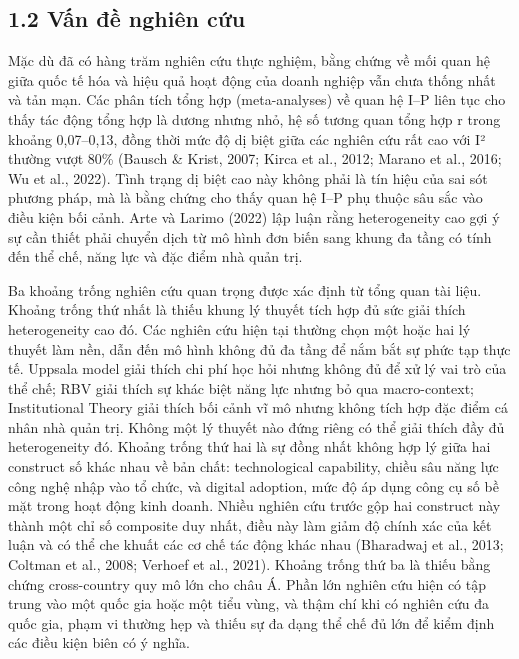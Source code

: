 \documentclass[12pt,a4paper]{article}
\begin{document}
\hypertarget{12-vux1ea5n-ux111ux1ec1-nghiuxean-cux1ee9u}{%
\subsection{1.2 Vấn đề nghiên
cứu}\label{12-vux1ea5n-ux111ux1ec1-nghiuxean-cux1ee9u}}

Mặc dù đã có hàng trăm nghiên cứu thực nghiệm, bằng chứng về mối quan hệ
giữa quốc tế hóa và hiệu quả hoạt động của doanh nghiệp vẫn chưa thống
nhất và tản mạn. Các phân tích tổng hợp (meta-analyses) về quan hệ I--P
liên tục cho thấy tác động tổng hợp là dương nhưng nhỏ, hệ số tương quan
tổng hợp r trong khoảng 0,07--0,13, đồng thời mức độ dị biệt giữa các
nghiên cứu rất cao với I² thường vượt 80\% (Bausch \& Krist, 2007; Kirca
et al., 2012; Marano et al., 2016; Wu et al., 2022). Tình trạng dị biệt
cao này không phải là tín hiệu của sai sót phương pháp, mà là bằng chứng
cho thấy quan hệ I--P phụ thuộc sâu sắc vào điều kiện bối cảnh. Arte và
Larimo (2022) lập luận rằng heterogeneity cao gợi ý sự cần thiết phải
chuyển dịch từ mô hình đơn biến sang khung đa tầng có tính đến thể chế,
năng lực và đặc điểm nhà quản trị.

Ba khoảng trống nghiên cứu quan trọng được xác định từ tổng quan tài
liệu. Khoảng trống thứ nhất là thiếu khung lý thuyết tích hợp đủ sức
giải thích heterogeneity cao đó. Các nghiên cứu hiện tại thường chọn một
hoặc hai lý thuyết làm nền, dẫn đến mô hình không đủ đa tầng để nắm bắt
sự phức tạp thực tế. Uppsala model giải thích chi phí học hỏi nhưng
không đủ để xử lý vai trò của thể chế; RBV giải thích sự khác biệt năng
lực nhưng bỏ qua macro-context; Institutional Theory giải thích bối cảnh
vĩ mô nhưng không tích hợp đặc điểm cá nhân nhà quản trị. Không một lý
thuyết nào đứng riêng có thể giải thích đầy đủ heterogeneity đó. Khoảng
trống thứ hai là sự đồng nhất không hợp lý giữa hai construct số khác
nhau về bản chất: technological capability, chiều sâu năng lực công nghệ
nhập vào tổ chức, và digital adoption, mức độ áp dụng công cụ số bề mặt
trong hoạt động kinh doanh. Nhiều nghiên cứu trước gộp hai construct này
thành một chỉ số composite duy nhất, điều này làm giảm độ chính xác của
kết luận và có thể che khuất các cơ chế tác động khác nhau (Bharadwaj et
al., 2013; Coltman et al., 2008; Verhoef et al., 2021). Khoảng trống thứ
ba là thiếu bằng chứng cross-country quy mô lớn cho châu Á. Phần lớn
nghiên cứu hiện có tập trung vào một quốc gia hoặc một tiểu vùng, và
thậm chí khi có nghiên cứu đa quốc gia, phạm vi thường hẹp và thiếu sự
đa dạng thể chế đủ lớn để kiểm định các điều kiện biên có ý nghĩa.
\end{document}
